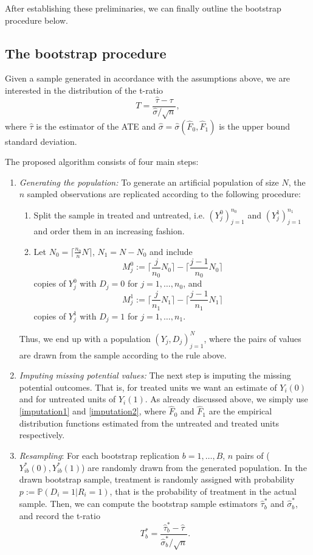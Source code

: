 \documentclass[aodsor,preprint]{imsart}
\numberwithin{equation}{section}
\theoremstyle{plain}
\begin{document}
After establishing these preliminaries, we can finally outline the bootstrap procedure below.

\subsection{The bootstrap procedure}

Given a sample generated in accordance with the assumptions above, we are interested in the distribution of the t-ratio
$$
T = \frac{\widehat{\tau} - \tau}{\widehat{\sigma} / \sqrt{n}},
$$
where $\widehat{\tau}$ is the estimator of the ATE and $\widehat{\sigma} = \widehat{\sigma}(\widehat{F}_0, \widehat{F}_1)$ is the upper bound standard deviation.

The proposed algorithm consists of four main steps:

\begin{enumerate}
	
	\item \textit{Generating the population:} To generate an artificial population of size $N$, the $n$ sampled observations are replicated according to the following procedure:
	\begin{enumerate}
		\item Split the sample in treated and untreated, i.e. $(Y_j^0)_{j=1}^{n_0}$ and $(Y_j^1)_{j=1}^{n_1}$ and order them in an increasing fashion.
		\item Let $N_0 = \lceil \frac{n_0}{n} N \rceil$, $N_1 = N - N_0$ and include 
		$$M_j^0 := \lceil \frac{j}{n_0} N_0 \rceil - \lceil \frac{j-1}{n_0} N_0 \rceil$$
		copies of $Y_j^0$ with $D_j = 0$ for $j = 1, \ldots, n_0$, and 
		$$M_j^1 := \lceil \frac{j}{n_1} N_1 \rceil - \lceil \frac{j-1}{n_1} N_1 \rceil$$
		copies of $Y_j^1$ with $D_j = 1$ for $j = 1, \ldots, n_1$.
	\end{enumerate}
	Thus, we end up with a population $(Y_j, D_j)_{j=1}^N$, where the pairs of values are drawn from the sample according to the rule above.
	
	\item \textit{Imputing missing potential values:} The next step is imputing the missing potential outcomes. That is, for treated units we want an estimate of $Y_i(0)$ and for untreated units of $Y_i(1)$. As already discussed above, we simply use \ref{imputation1} and \ref{imputation2}, where $\widehat{F}_0$ and $\widehat{F}_1$ are the empirical distribution functions estimated from the untreated and treated units respectively.
	
	\item \textit{Resampling}: For each bootstrap replication $b = 1,\ldots, B$, $n$ pairs of ($Y_{ib}^*(0), Y_{ib}^*(1)$) are randomly drawn from the generated population. In the drawn bootstrap sample, treatment is randomly assigned with probability $p:= \mathbb{P}(D_i = 1 | R_i = 1)$, that is the probability of treatment in the actual sample. Then, we can compute the bootstrap sample estimators $\widehat{\tau}_b^*$ and $\widehat{\sigma}_b^*$, and record the t-ratio
	$$
	T_b^* = \frac{\widehat{\tau}_b^* - \widehat{\tau}}{\widehat{\sigma}_b^* / \sqrt{n}}.
	$$
	

\end{enumerate}
\end{document}
